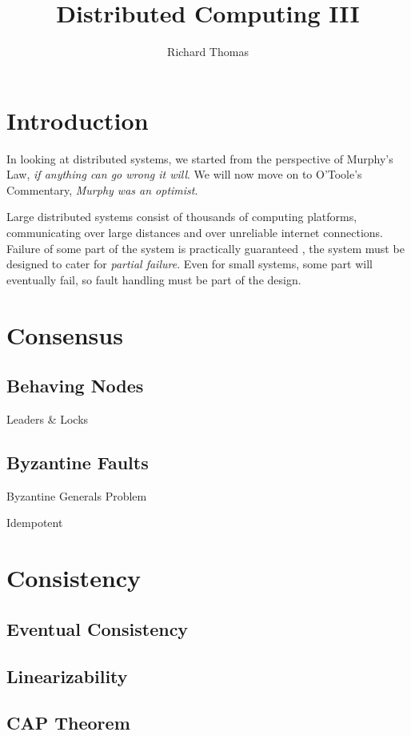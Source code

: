 \title{Distributed Computing III}
\author{Richard Thomas}
\date{}

\maketitle

\section{Introduction}

In looking at distributed systems, we started from the perspective of Murphy's Law,
\textit{if anything can go wrong it will}.
We will now move on to O'Toole's Commentary, \textit{Murphy was an optimist}.

Large distributed systems consist of thousands of computing platforms,
communicating over large distances and over unreliable internet connections.
Failure of some part of the system is practically guaranteed \cite{datacenter-computer},
the system must be designed to cater for \emph{partial failure}.
Even for small systems, some part will eventually fail,
so fault handling must be part of the design.


\section{Consensus}

\subsection{Behaving Nodes}
Leaders \& Locks

\subsection{Byzantine Faults}
Byzantine Generals Problem

Idempotent

\section{Consistency}

\subsection{Eventual Consistency}

\subsection{Linearizability}

\subsection{CAP Theorem}
